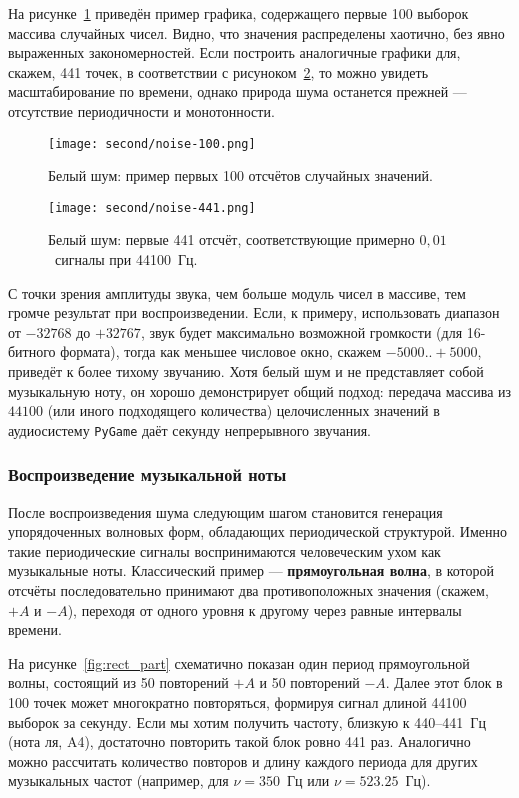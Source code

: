 \documentclass[bachelor, och, diploma]{SCWorks}
\begin{document}
На рисунке~\ref{fig:noise_100} приведён пример графика, содержащего первые 100 выборок массива случайных чисел. Видно, что значения распределены хаотично, без явно выраженных закономерностей. Если построить аналогичные графики для, скажем, 441 точек, в соответствии с рисуноком~\ref{fig:noise_441}, то можно увидеть масштабирование по времени, однако природа шума останется прежней --- отсутствие периодичности и монотонности.

\begin{figure}[h!]
\centering
\texttt{[image: second/noise-100.png]}
\caption{Белый шум: пример первых 100 отсчётов случайных значений.}
\label{fig:noise_100}
\end{figure}

\begin{figure}[h!]
\centering
\texttt{[image: second/noise-441.png]}
\caption{Белый шум: первые 441 отсчёт, соответствующие примерно $0{,}01$~сигналы при 44100~Гц.}
\label{fig:noise_441}
\end{figure}

С точки зрения амплитуды звука, чем больше модуль чисел в массиве, тем громче результат при воспроизведении. Если, к примеру, использовать диапазон от $-32768$ до $+32767$, звук будет максимально возможной громкости (для 16-битного формата), тогда как меньшее числовое окно, скажем $-5000..+5000$, приведёт к более тихому звучанию. Хотя белый шум и не представляет собой музыкальную ноту, он хорошо демонстрирует общий подход: передача массива из $44100$ (или иного подходящего количества) целочисленных значений в аудиосистему \texttt{PyGame} даёт секунду непрерывного звучания.

\subsubsection{Воспроизведение музыкальной ноты}

После воспроизведения шума следующим шагом становится генерация упорядоченных волновых форм, обладающих периодической структурой. Именно такие периодические сигналы воспринимаются человеческим ухом как музыкальные ноты. Классический пример --- \textbf{прямоугольная волна}, в которой отсчёты последовательно принимают два противоположных значения (скажем, $+A$ и $-A$), переходя от одного уровня к другому через равные интервалы времени.

На рисунке~\ref{fig:rect_part} схематично показан один период прямоугольной волны, состоящий из 50 повторений $+A$ и 50 повторений $-A$. Далее этот блок в 100 точек может многократно повторяться, формируя сигнал длиной 44100 выборок за секунду. Если мы хотим получить частоту, близкую к 440--441~Гц (нота ля, A4), достаточно повторить такой блок ровно 441 раз. Аналогично можно рассчитать количество повторов и длину каждого периода для других музыкальных частот (например, для $\nu=350$~Гц или $\nu=523.25$~Гц).
\end{document}
